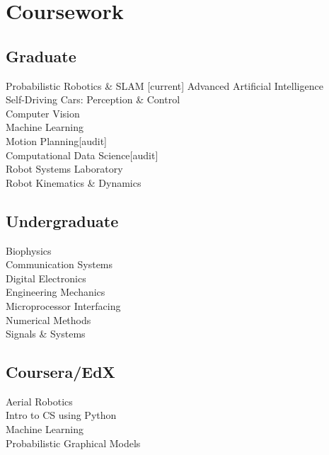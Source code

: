 \documentclass[letterpaper]{deedy-resume} %
\begin{document}
\begin{minipage}[t]{0.25\textwidth}
\sectionspace %


\section{Coursework}

\subsection{Graduate}
Probabilistic Robotics & SLAM [current]
Advanced Artificial Intelligence \\
Self-Driving Cars: Perception \& Control \\
Computer Vision \\
Machine Learning \\
Motion Planning[audit] \\
Computational Data Science[audit] \\
Robot Systems Laboratory \\
Robot Kinematics \& Dynamics

\sectionspace %


\subsection{Undergraduate}

Biophysics \\
Communication Systems \\
Digital Electronics \\
Engineering Mechanics \\
Microprocessor Interfacing \\
Numerical Methods \\
Signals \& Systems \\
\sectionspace
\subsection{Coursera/EdX}

Aerial Robotics \\
Intro to CS using Python \\
Machine Learning \\
Probabilistic Graphical Models \\


\end{minipage}
\end{document}
